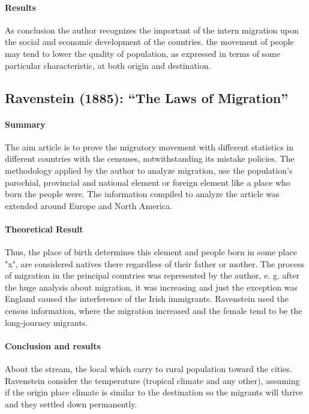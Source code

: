 \documentclass[11pt]{article}
\theoremstyle{prop}
\begin{document}
	\paragraph{Results}
	As conclusion the author recognizes the important of the intern migration upon the social and economic development of the countries.
	the movement of people may tend to lower the quality of population, as expressed in terms of some particular characteristic, at both origin and destination.
	 
	 \newpage
	 
	\subsection{Ravenstein (1885): ``The Laws of Migration''}
	
	\paragraph{Summary}
	The aim article is to prove the migratory movement with different statistics in different countries with the censuses, notwithstanding its mistake policies. The methodology applied by the author to analyze migration, use the population's parochial, provincial and national element or foreign element like a place who born the people were.
	The information compiled to analyze the article was extended around Europe and North America. 
	
	\paragraph{Theoretical Result} Thus, the place of birth determines this element and people born in some place "x", are considered natives there regardless of their father or mother. The process of migration in the principal countries was represented by the author, e. g. after the huge analysis about migration, it was increasing and just the exception was England caused the interference of the Irish immigrants. Ravenstein used the census information, where the migration increased and the female tend to be the long-journey migrants. 
	
	\paragraph{Conclusion and results} About the stream, the local which carry to rural population toward the cities. 
	Ravenstein consider the temperature (tropical climate and any other), assuming if the origin place climate is similar to the destination so the migrants will thrive and they settled down permanently. 
	
\end{document}
